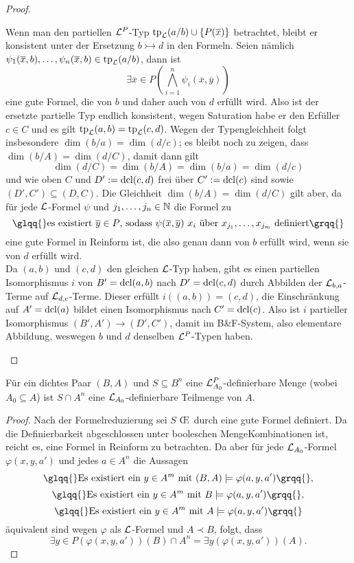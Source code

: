 \begin{proof}
\begin{proof2}
		Wenn man den partiellen $\mathcal{L}^P$-Typ $\operatorname{tp}_{\mathcal{L}}(a/b)\cup\{P(\overline{x})\}$ betrachtet, bleibt er konsistent unter der Ersetzung $b\rightarrowtail d$ in den Formeln. Seien nämlich $\psi_1(\overline{x},b),\dots,\psi_n(\overline{x},b)\in\operatorname{tp}_{\mathcal{L}}(a/b)$, dann ist $$\exists\overline{x}\in P(\bigwedge\limits_{i=1}^n\psi_i(\overline{x},\overline{y}))$$ eine gute Formel, die von $b$ und daher auch von $d$ erfüllt wird. Also ist der ersetzte partielle Typ endlich konsistent, wegen Saturation habe er den Erfüller $c\in C$ und es gilt $\operatorname{tp}_{\mathcal{L}}(a,b)=\operatorname{tp}_{\mathcal{L}}(c,d)$. Wegen der Typengleichheit folgt insbesondere $\dim(b/a)=\dim(d/c)$; es bleibt noch zu zeigen, dass $\dim(b/A)=\dim(d/C)$, damit dann gilt $$\dim(d/C)=\dim(b/A)=\dim(b/a)=\dim(d/c)$$ und wie oben $C$ und $D':=\operatorname{dcl}(c,d)$ frei über $C':=\operatorname{dcl}(c)$ sind sowie $(D',C')\subseteq(D,C)$. Die Gleichheit $\dim(b/A)=\dim(d/C)$ gilt aber, da für jede $\mathcal{L}$-Formel $\psi$ und $j_1,\dots,j_n\in\mathbb{N}$ die Formel zu $$\glqq{}\text{es existiert }\overline{y}\in P\text{, sodass }\psi(\overline{x},\overline{y})\ x_i\text{ über }x_{j_1},\dots,x_{j_m}\text{ definiert}\grqq{}$$ eine gute Formel in Reinform ist, die also genau dann von $b$ erfüllt wird, wenn sie von $d$ erfüllt wird.\\
		Da $(a,b)$ und $(c,d)$ den gleichen $\mathcal{L}$-Typ haben, gibt es einen partiellen Isomorphismus $i$ von $B'=\operatorname{dcl}(a,b)$ nach $D'=\operatorname{dcl}(c,d)$ durch Abbilden der $\mathcal{L}_{b,a}$-Terme auf $\mathcal{L}_{d,c}$-Terme. Dieser erfüllt $i((a,b))=(c,d)$, die Einschränkung auf $A'=\operatorname{dcl}(a)$ bildet einen Isomorphismus nach $C'=\operatorname{dcl}(c)$. Also ist $i$ partieller Isomorphismus $(B',A')\rightarrow(D',C')$, damit im B\&F-System, also elementare Abbildung, weswegen $b$ und $d$ denselben $\mathcal{L}^P$-Typen haben.
	\end{proof2}
\end{proof}

\begin{corollary}\label{Definierbarkeit aus A}
	Für ein dichtes Paar $(B,A)$ und $S\subseteq B^n$ eine $\mathcal{L}^P_{A_0}$-definierbare Menge (wobei $A_0\subseteq A$) ist $S\cap A^n$ eine $\mathcal{L}_{A_0}$-definierbare Teilmenge von $A$.
\end{corollary}
\begin{proof}
	Nach der Formelreduzierung sei $S$ \OE\ durch eine gute Formel definiert. Da die Definierbarkeit abgeschlossen unter booleschen MengeKombinationen ist, reicht es, eine Formel in Reinform zu betrachten.\newpage
	Da aber für jede $\mathcal{L}_{A_0}$-Formel $\varphi(x,y,a')$ und jedes $a\in A^n$ die Aussagen $$\glqq{}\text{Es existiert ein }y\in A^m\text{ mit }(B,A)\models\varphi(a,y,a')\grqq{},$$ $$\glqq{}\text{Es existiert ein }y\in A^m\text{ mit }B\models\varphi(a,y,a')\grqq{},$$ $$\glqq{}\text{Es existiert ein }y\in A^m\text{ mit }A\models\varphi(a,y,a')\grqq{}$$ äquivalent sind wegen $\varphi$ als $\mathcal{L}$-Formel und $A\prec B$, folgt, dass $$\exists y\in P(\varphi(x,y,a'))(B)\cap A^n=\exists y(\varphi(x,y,a'))(A).$$
\end{proof}

